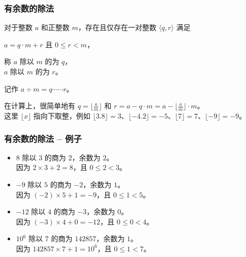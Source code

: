 \documentclass{../pkslide}
\begin{document}
\begin{frame}
  \frametitle{有余数的除法}
  \begin{definition}[有余数的除法]
    对于整数 $a$ 和正整数 $m$，存在且仅存在一对整数 $\langle q, r \rangle$ 满足%
    \begin{center}
      $a = q \cdot m + r$ 且 $0 \le r < m$，
    \end{center}%
    称 $a$ 除以 $m$ 的\hspace{.5em}\hspace{.5em}为 $q$，\\
    \-\hspace{1em} $a$ 除以 $m$ 的为 $r$。
    
    记作 $a \div m = q \cdots \cdots r$。
  \end{definition}
  
  \pause
  \emptyline
  在计算上，很简单地有 $q = \big\lfloor \frac{a}{m} \big\rfloor$ 和 $r = a - q \cdot m = a - \big\lfloor \frac{a}{m} \big\rfloor \cdot m$。\\
  这里 $\lfloor x \rfloor$ 指向下取整，例如 $\lfloor 3.8 \rfloor = 3$、$\lfloor -4.2 \rfloor = -5$、$\lfloor 7 \rfloor = 7$、$\lfloor -9 \rfloor = -9$。
\end{frame}

\begin{frame}
  \frametitle{有余数的除法 -- 例子}
  
  \begin{examples}[有余数的除法]
    \begin{itemize}
      \item $8$ 除以 $3$ 的商为 $2$，余数为 $2$。\\
        因为 $2 \times 3 + 2 = 8$，且 $0 \le 2 < 3$。
      \item $-9$ 除以 $5$ 的商为 $-2$，余数为 $1$。\\
        因为 $(-2) \times 5 + 1 = -9$，且 $0 \le 1 < 5$。
      \item $-12$ 除以 $4$ 的商为 $-3$，余数为 $0$。\\
        因为 $(-3) \times 4 + 0 = -12$，且 $0 \le 0 < 4$。
      \item ${10}^6$ 除以 $7$ 的商为 $142857$，余数为 $1$。\\
        因为 $142857 \times 7 + 1 = {10}^6$，且 $0 \le 1 < 7$。
    \end{itemize}
  \end{examples}
  
\end{frame}
\end{document}
